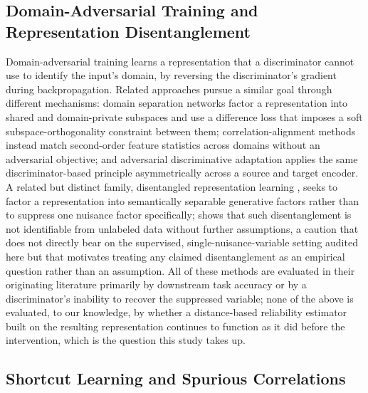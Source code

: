 \subsection{Domain-Adversarial Training and Representation Disentanglement}
\label{sec:rw-disentanglement}

Domain-adversarial training \citep{ganin2015unsupervised, ganin2016domain} learns a representation that a discriminator cannot use to identify the input's domain, by reversing the discriminator's gradient during backpropagation. Related approaches pursue a similar goal through different mechanisms: domain separation networks \citep{bousmalis2016domain} factor a representation into shared and domain-private subspaces and use a difference loss that imposes a soft subspace-orthogonality constraint between them; correlation-alignment methods \citep{sun2016coral} instead match second-order feature statistics across domains without an adversarial objective; and adversarial discriminative adaptation \citep{tzeng2017adversarial} applies the same discriminator-based principle asymmetrically across a source and target encoder. A related but distinct family, disentangled representation learning \citep{higgins2017betavae}, seeks to factor a representation into semantically separable generative factors rather than to suppress one nuisance factor specifically; \citet{locatello2019challenging} shows that such disentanglement is not identifiable from unlabeled data without further assumptions, a caution that does not directly bear on the supervised, single-nuisance-variable setting audited here but that motivates treating any claimed disentanglement as an empirical question rather than an assumption. All of these methods are evaluated in their originating literature primarily by downstream task accuracy or by a discriminator's inability to recover the suppressed variable; none of the above is evaluated, to our knowledge, by whether a distance-based reliability estimator built on the resulting representation continues to function as it did before the intervention, which is the question this study takes up.

\subsection{Shortcut Learning and Spurious Correlations}
\label{sec:rw-shortcut}

